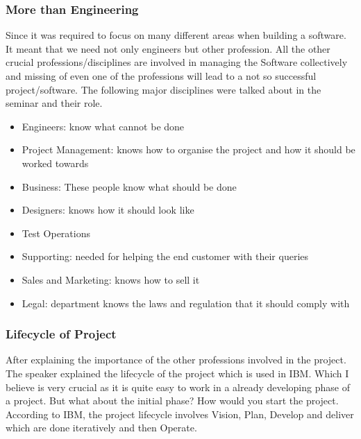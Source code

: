 \subsubsection{More than Engineering}

Since it was required to focus on many different areas when building a software. It meant that we need not only engineers but other profession. All the other crucial professions/disciplines are involved in managing the Software collectively and missing of even one of the professions will lead to a not so successful project/software. The following major disciplines were talked about in the seminar and their role.

\begin{itemize}
    \item Engineers: know what cannot be done
    \item Project Management: knows how to organise the project and how it should be worked towards
    \item Business: These people know what should be done
    \item Designers: knows how it should look like
    \item Test Operations
    \item Supporting: needed for helping the end customer with their queries
    \item Sales and Marketing: knows how to sell it
    \item Legal: department knows the laws and regulation that it should comply with
\end{itemize}

\subsubsection{Lifecycle of Project}

After explaining the importance of the other professions involved in the project. The speaker explained the lifecycle of the project which is used in IBM. Which I believe is very crucial as it is quite easy to work in a already developing phase of a project. But what about the initial phase? How would you start the project. According to IBM, the project lifecycle involves Vision, Plan, Develop and deliver which are done iteratively and then Operate.

